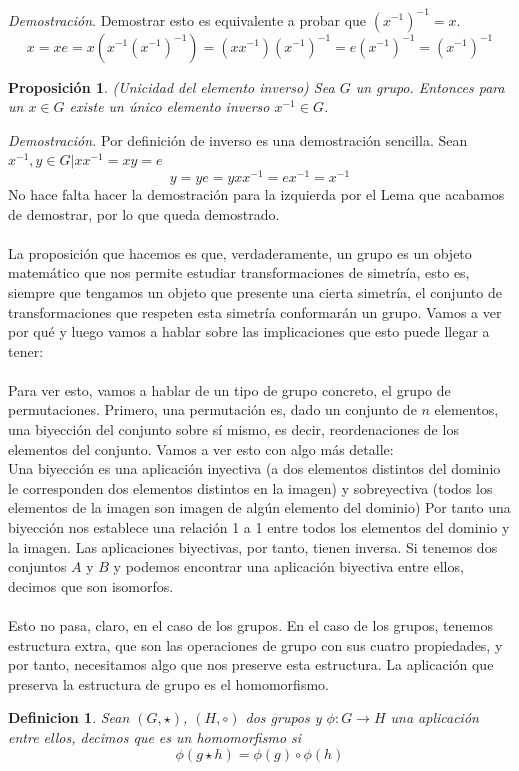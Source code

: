\documentclass[12pt]{article}
\newtheorem{defi}{Definicion}
\newtheorem{prop}{Proposición}
\begin{document}
\textit{Demostración}. Demostrar esto es equivalente a probar que $(x^{-1})^{-1}=x$. 
$$x=xe=x(x^{-1}(x^{-1})^{-1})=(xx^{-1})(x^{-1})^{-1}=e(x^{-1})^{-1}=(x^{-1})^{-1}$$
\begin{prop}
    (Unicidad del elemento inverso) Sea $G$ un grupo. Entonces para un $x\in G$ existe un único elemento inverso $x^{-1}\in G$.
\end{prop} 
\textit{Demostración.} Por definición de inverso es una demostración sencilla. Sean $x^{-1},y\in G |xx^{-1}=xy=e$
$$y=ye=yxx^{-1}=ex^{-1}=x^{-1}$$
No hace falta hacer la demostración para la izquierda por el Lema que acabamos de demostrar, por lo que queda demostrado.\\\\
La proposición que hacemos es que, verdaderamente, un grupo es un objeto matemático que nos permite estudiar transformaciones de simetría, esto es, siempre que tengamos un objeto que presente una cierta simetría, el conjunto de transformaciones que respeten esta simetría conformarán un grupo. Vamos a ver por qué y luego vamos a hablar sobre las implicaciones que esto puede llegar a tener: \\\\
Para ver esto, vamos a hablar de un tipo de grupo concreto, el grupo de permutaciones. Primero, una permutación es, dado un conjunto de $n$ elementos, una biyección del conjunto sobre sí mismo, es decir, reordenaciones de los elementos del conjunto. Vamos a ver esto con algo más detalle:\\
Una biyección es una aplicación inyectiva (a dos elementos distintos del dominio le corresponden dos elementos distintos en la imagen) y sobreyectiva (todos los elementos de la imagen son imagen de algún elemento del dominio) Por tanto una biyección nos establece una relación 1 a 1 entre todos los elementos del dominio y la imagen. Las aplicaciones biyectivas, por tanto, tienen inversa. Si tenemos dos conjuntos $A$ y $B$ y podemos encontrar una aplicación biyectiva entre ellos, decimos que son isomorfos. \\\\
Esto no pasa, claro, en el caso de los grupos. En el caso de los grupos, tenemos estructura extra, que son las operaciones de grupo con sus cuatro propiedades, y por tanto, necesitamos algo que nos preserve esta estructura. La aplicación que preserva la estructura de grupo es el homomorfismo. 
\begin{defi}
    Sean $(G, \star)$, $(H, \circ)$ dos grupos y $\phi: G\longrightarrow H$ una aplicación entre ellos, decimos que es un homomorfismo si 
    $$\phi(g\star h) = \phi (g)\circ \phi (h) $$
\end{defi}
\end{document}
